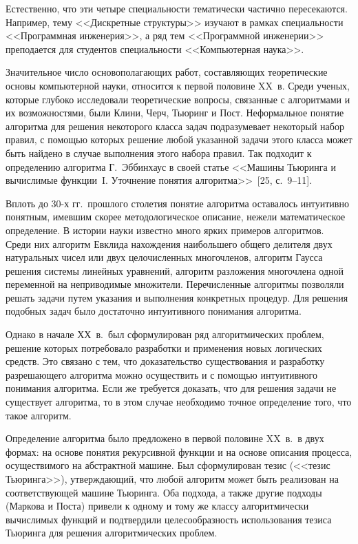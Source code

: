 \begin{multicols}{2}
      Естественно, что эти четыре специальности тематически частично пересекаются.
Например, тему <<Дискретные структуры>> изучают в рамках специальности <<Программная
инженерия>>, а ряд тем <<Программной инженерии>> преподается для студентов
специальности <<Компьютерная наука>>.

      Значительное число основополагающих работ, составляющих теоретические основы
компьютерной науки, относится к первой половине XX~в. Среди ученых, которые глубоко
исследовали теоретические вопросы, связанные с алгоритмами и их возможностями, были
Клини, Черч, Тьюринг и Пост. Неформальное понятие алгоритма для решения некоторого
класса задач подразумевает некоторый набор правил, с помощью которых решение любой
указанной задачи этого класса может быть найдено в случае выполнения этого набора правил.
Так подходит к определению алгоритма Г.~Эббинхаус в своей статье <<Машины Тьюринга и
вычислимые функции~I. Уточнение понятия алгоритма>>~[25, с.~9--11].

      Вплоть до 30-х гг.\ прошлого столетия понятие алгоритма оставалось интуитивно
понятным, имевшим скорее методологическое описание, нежели математическое определение.
В истории науки известно много ярких примеров алгоритмов. Среди них алгоритм Евклида
нахождения наибольшего общего делителя двух натуральных чисел или двух целочисленных
многочленов, алгоритм Гаусса решения системы линейных уравнений, алгоритм разложения
многочлена одной переменной на неприводимые множители. Перечисленные алгоритмы
позволяли решать задачи путем указания и выполнения конкретных процедур. Для решения
подобных задач было достаточно интуитивного понимания алгоритма.

      Однако в начале ХХ~в.\ был сформулирован ряд алгоритмических проблем, решение
которых потребовало разработки и применения новых логических средств. Это связано с тем,
что доказательство существования и разработку разрешающего алгоритма можно осуществить
и с помощью интуитивного понимания алгоритма. Если же требуется доказать, что для решения
задачи не существует алгоритма, то в этом случае необходимо точное определение того, что
такое алгоритм.

      Определение алгоритма было предложено в первой половине XX~в.\ в двух формах: на
основе понятия рекурсивной функции и на основе описания процесса, осуществимого на
абстрактной машине. Был сформулирован тезис (<<тезис Тьюринга>>), утверждающий, что
любой алгоритм может быть реализован на соответствующей машине Тьюринга. Оба подхода, а
также другие подходы (Маркова и Поста) привели к одному и тому же классу алгоритмически
вычислимых функций и подтвердили целесообразность использования тезиса Тьюринга для
решения алгоритмических проблем.


\end{multicols}
